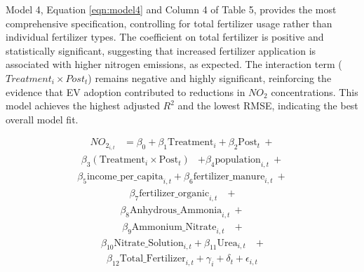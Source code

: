 \documentclass[12pt]{article}
\begin{document}
\begin{multicols}{2}
		Model 4, Equation \eqref{eqn:model4} and Column 4 of Table 5, provides the most comprehensive specification, controlling for total fertilizer usage rather than individual fertilizer types. The coefficient on total fertilizer is positive and statistically significant, suggesting that increased fertilizer application is associated with higher nitrogen emissions, as expected. The interaction term ($Treatment_i \times Post_t$) remains negative and highly significant, reinforcing the evidence that EV adoption contributed to reductions in $NO_2$ concentrations. This model achieves the highest adjusted $ R^2$ and the lowest RMSE, indicating the best overall model fit.
		\newpage
		
		\begin{align}
			NO_{2_{i,t}} &= \beta_0 + \beta_1 \text{Treatment}_{i} + \beta_2 \text{Post}_{t}\ + \nonumber \end{align} \begin{align}
			\beta_3 (\text{Treatment}_{i} \times \text{Post}_{t})
			& + \beta_4 \text{population}_{i,t}\ + \nonumber \end{align} \begin{align}
			\beta_5 \text{income\_per\_capita}_{i,t} 
			+ \beta_6 \text{fertilizer\_manure}_{i,t}\ + \nonumber \end{align} \begin{align} \beta_7 \text{fertilizer\_organic}_{i,t}
			& \ + \nonumber \end{align} \begin{align} \beta_8 \text{Anhydrous\_Ammonia}_{i,t}\ + \nonumber  \end{align} \begin{align} \beta_9 \text{Ammonium\_Nitrate}_{i,t}
			&\ + \nonumber \end{align} \begin{align} \beta_{10} \text{Nitrate\_Solution}_{i,t} + \beta_{11} \text{Urea}_{i,t}
			&\ + \nonumber \end{align} \begin{align}  \beta_{12} \text{Total\_Fertilizer}_{i,t} + \gamma_i + \delta_t + \epsilon_{i,t} \label{eqn:model4}
		\end{align}
		

\end{multicols}
\end{document}
